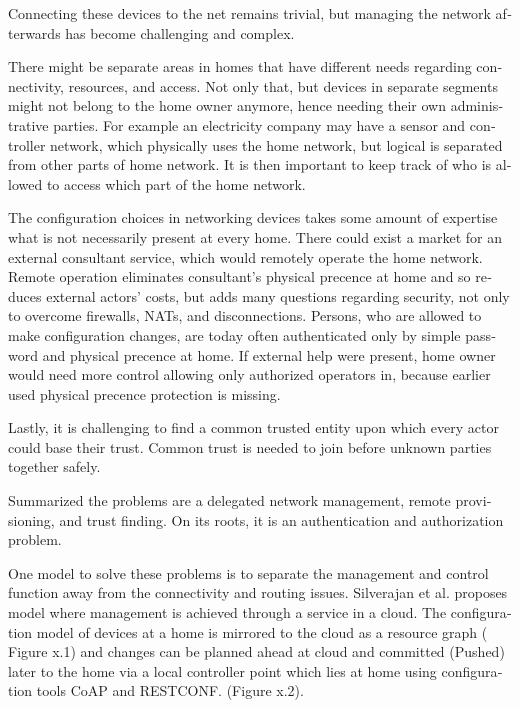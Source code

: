\documentclass[12pt,a4paper,english]{tutthesis}
\begin{document}
\begin{otherlanguage}{english}
Connecting these devices to the net remains trivial, but managing the
network afterwards has become challenging and complex.

There might be separate areas in homes that have different needs regarding
connectivity, resources, and access. Not only that, but devices in
separate segments might not belong to the home owner anymore, hence needing
their own administrative parties. For example an electricity company may
have a sensor and controller network, which physically uses the home network, but
logical is separated from other parts of home network. It is then
important to keep track of who is allowed to access which part of the
home network. 


The configuration choices in networking devices takes some
amount of expertise what is not necessarily present at every
home. There could exist a market for an external consultant service, which would
remotely operate the home network.
Remote operation eliminates consultant's 
physical precence at home and so reduces external actors' costs, but adds many questions
regarding security, not only to overcome firewalls, NATs, and disconnections.
Persons, who are allowed to make configuration changes, are today
often authenticated only by simple password and physical precence at home.
If external help were present, home owner would need more 
control allowing only authorized operators in, because earlier used
physical precence protection is missing.

Lastly, it is challenging to find a common 
trusted entity upon which every actor could base their trust.
Common trust is needed to join before unknown parties together
safely. 

Summarized the problems are a delegated network management, remote
provisioning, and trust finding. On its roots, it is an authentication
and authorization problem.










One model to solve these problems is to separate the management and
control function away from the connectivity and routing
issues. Silverajan et al.\cite{silverajan2015collaborative} proposes
model where management is achieved through a service in a cloud. The
configuration model of devices at a home is mirrored to the cloud as a
resource graph ( Figure x.1) and changes can be planned ahead at cloud
and committed (Pushed) later to the home via a local controller point
which lies at home using configuration tools CoAP and RESTCONF.
(Figure x.2).


\end{otherlanguage}
\end{document}
